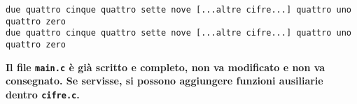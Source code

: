 \documentclass[12pt]{article}
\begin{document}
\begin{mdframed}[backgroundcolor=verylightgray] 
\begin{verbatim}
due quattro cinque quattro sette nove [...altre cifre...] quattro uno quattro zero 
due quattro cinque quattro sette nove [...altre cifre...] quattro uno quattro zero
\end{verbatim}
\end{mdframed}

\begin{mdframed}[backgroundcolor=lightred] 
  \textbf{Il file \texttt{main.c} \`e gi\`a scritto e completo,
    non va modificato e non va consegnato. Se servisse, si possono aggiungere funzioni ausiliarie dentro \texttt{cifre.c}.}
\end{mdframed}
\end{document}
